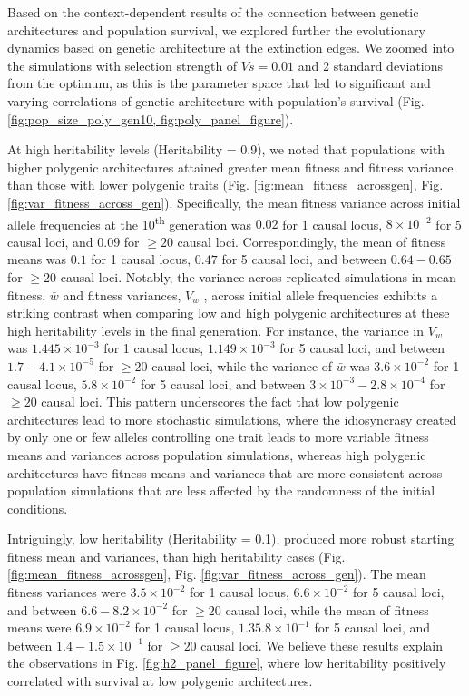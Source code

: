 \documentclass{article}
\begin{document}
Based on the context-dependent results of the connection between genetic architectures and population survival, we explored further the evolutionary dynamics based on genetic architecture at the extinction edges. We zoomed into the simulations with selection strength of $Vs=0.01$  and 2 standard deviations from the optimum, as this is the parameter space that led to significant and varying correlations of genetic architecture with population's survival (Fig. \ref{fig:pop_size_poly_gen10, fig:poly_panel_figure}). 

At high heritability levels (Heritability = 0.9), we noted that populations with higher polygenic architectures attained greater mean fitness and fitness variance than those with lower polygenic traits (Fig. \ref{fig:mean_fitness_acrossgen}, Fig. \ref{fig:var_fitness_across_gen}). Specifically, the mean fitness variance across initial allele frequencies at the 10\textsuperscript{th} generation was $0.02$ for 1 causal locus, $8 \times 10^{-2}$  for 5 causal loci, and $0.09$  for $\geq 20$ causal loci. Correspondingly, the mean of fitness means was $0.1$ for 1 causal locus, $0.47$  for 5 causal loci, and between $0.64- 0.65$  for $\geq 20$ causal loci. Notably, the variance across replicated simulations in mean fitness, $\bar{w}$ and fitness variances, $V_w$ , across initial allele frequencies exhibits a striking contrast when comparing low and high polygenic architectures at these high heritability levels in the final generation. For instance, the variance in $V_w$  was $1.445 \times 10^{-3}$ for 1 causal locus, $1.149 \times 10^{-3}$ for 5 causal loci, and between $1.7-4.1 \times 10^{-5}$ for $\geq 20$ causal loci, while the variance of $\bar{w}$  was $3.6 \times 10^{-2}$ for 1 causal locus, $5.8 \times 10^{-2}$ for 5 causal loci, and between $3 \times 10^{-3} - 2.8 \times 10^{-4}$ for $\geq 20$ causal loci. This pattern underscores the fact that low polygenic architectures lead to more stochastic simulations, where the idiosyncrasy created by only one or few alleles controlling one trait leads to more variable fitness means and variances across population simulations, whereas high polygenic architectures have fitness means and variances that are more consistent across population simulations that are less affected by the randomness of the initial conditions.

Intriguingly, low heritability (Heritability = 0.1), produced more robust starting fitness mean and variances, than high heritability cases (Fig. \ref{fig:mean_fitness_acrossgen}, Fig. \ref{fig:var_fitness_across_gen}). The mean fitness variances were $3.5 \times 10^{-2}$ for 1 causal locus, $6.6 \times 10^{-2}$ for 5 causal loci, and between $6.6-8.2 \times 10^{-2}$ for $\geq 20$ causal loci, while the mean of fitness means were $6.9 \times 10^{-2}$ for 1 causal locus, $1.35.8 \times 10^{-1}$ for 5 causal loci, and between $1.4- 1.5 \times 10^{-1}$ for $\geq 20$ causal loci. We believe these results explain  the observations in Fig. \ref{fig:h2_panel_figure}, where low heritability positively correlated with survival at low polygenic architectures. 
\end{document}
